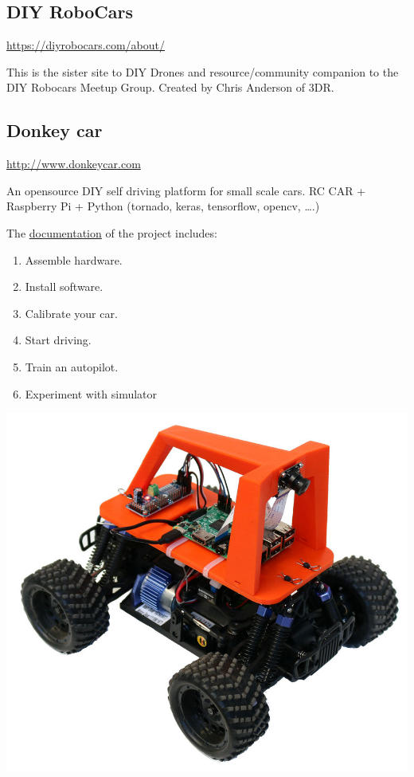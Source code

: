 \documentclass[]{book}
\providecommand{\tightlist}{%
  \setlength{\itemsep}{0pt}\setlength{\parskip}{0pt}}
\begin{document}
\subsection{DIY RoboCars}\label{diy-robocars}

\url{https://diyrobocars.com/about/}

This is the sister site to DIY Drones and resource/community companion
to the DIY Robocars Meetup Group. Created by Chris Anderson of 3DR.

\subsection{Donkey car}\label{donkey-car}

\url{http://www.donkeycar.com}

An opensource DIY self driving platform for small scale cars. RC CAR +
Raspberry Pi + Python (tornado, keras, tensorflow, opencv, \ldots{}.)

The \href{http://docs.donkeycar.com}{documentation} of the project
includes:

\begin{enumerate}
\def\labelenumi{\arabic{enumi}.}
\tightlist
\item
  Assemble hardware.
\item
  Install software.
\item
  Calibrate your car.
\item
  Start driving.
\item
  Train an autopilot.
\item
  Experiment with simulator
\end{enumerate}

\includegraphics[width=12.47in]{images/donkey-car-graphic_orig}
\end{document}
